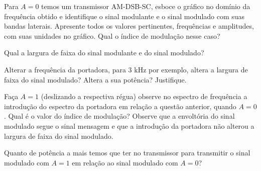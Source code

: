\documentclass[12pt,addpoints]{exam}
\begin{document}
\begin{questions}
    \question Para $A = 0$ temos um transmissor AM-DSB-SC, esboce o gráfico no domínio da frequência obtido e identifique o sinal modulante e o sinal modulado com suas bandas laterais. Apresente todos os valores pertinentes, frequências e amplitudes, com suas unidades no gráfico. Qual o índice de modulação nesse caso?
    \makeemptybox{5cm}
    
    \question Qual a largura de faixa do sinal modulante e do sinal modulado?
    \fillwithlines{0.5in}

    \question Alterar a frequência da portadora, para 3 kHz por exemplo, altera a largura de faixa do sinal modulado? Altera a sua potência? Justifique.
    \fillwithlines{0.75in}

    \question Faça $A = 1$ (deslizando a respectiva régua) observe no espectro de frequência a introdução do espectro da portadora  em relação a questão anterior, quando $A=0$. Qual é o valor do índice de modulação? Observe que a envoltória do sinal modulado segue o sinal mensagem e que a introdução da portadora não alterou a largura de faixa do sinal modulado. %
    \fillwithlines{0.5in}


    \question Quanto de potência a mais temos que ter no transmissor para transmitir o sinal modulado com $A=1$ em relação ao sinal modulado com $A=0$?
    \fillwithlines{0.5in}

    
    

\end{questions}
\end{document}
